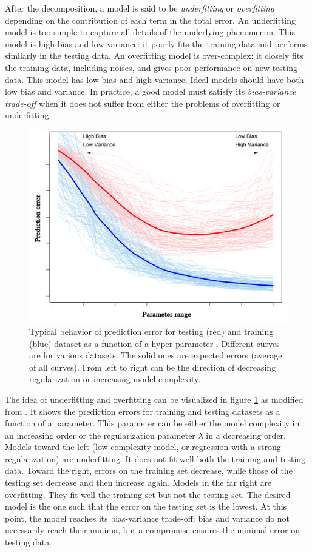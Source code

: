 After the decomposition, a model is said to be \textit{underfitting} or \textit{overfitting} depending on the contribution of each term in the total error. An underfitting model is too simple to capture all details of the underlying phenomenon. This model is high-bias and low-variance: it poorly fits the training data and performs similarly in the testing data. An overfitting model is over-complex: it closely fits the training data, including noises, and gives poor performance on new testing data. This model has low bias and high variance. Ideal models should have both low bias and variance. In practice, a good model must satisfy its \textit{bias-variance trade-off} when it does not suffer from either the problems of overfitting or underfitting.  

\begin{figure}
\centering
	\includegraphics[width=0.7\columnwidth]{./images/regression/bias-variance_tradeoff.png}
	\caption{\label{fig:bias-variance_tradeoff} Typical behavior of prediction error for testing (red) and training (blue) dataset as a function of a hyper-parameter \citep{hastie2009elements}. Different curves are for various datasets. The solid ones are expected errors (average of all curves). From left to right can be the direction of decreasing regularization or increasing model complexity.}
\end{figure}

The idea of underfitting and overfitting can be visualized in figure \ref{fig:bias-variance_tradeoff} as modified from \citet{hastie2009elements}. It shows the prediction errors for training and testing datasets as a function of a parameter. This parameter can be either the model complexity in an increasing order or the regularization parameter $ \lambda $ in a decreasing order. Models toward the left (low complexity model, or regression with a strong regularization) are underfitting. It does not fit well both the training and testing data. Toward the right, errors on the training set decrease, while those of the testing set decrease and then increase again. Models in the far right are overfitting. They fit well the training set but not the testing set. The desired model is the one such that the error on the testing set is the lowest. At this point, the model reaches its bias-variance trade-off: bias and variance do not necessarily reach their minima, but a compromise ensures the minimal error on testing data.

